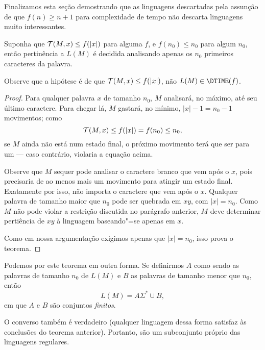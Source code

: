 Finalizamos esta seção demostrando que
as linguagens descartadas pela assunção de que
$f(n) \geq n+1$ para complexidade de tempo
não descarta linguagens muito interessantes.

\begin{proposition}
    Suponha que ${\mathcal{T}}(M, x) \leq f(|x|)$ para alguma $f$,
    e $f(n_0) \leq n_0$ para algum $n_0$,
    então pertinência a $L(M)$
    é decidida analisando apenas os $n_0$ primeiros caracteres da palavra.
    \label{regularidade_tempo_sublinear}
\end{proposition}

Observe que a hipótese é de que
${\mathcal{T}}(M, x) \leq f(|x|)$,
não
$L(M) \in \DTIME(f)$.

\begin{proof}
    Para qualquer palavra $x$ de tamanho $n_0$,
    $M$ analisará,
    no máximo,
    até seu último caractere.
    Para chegar lá, $M$ gastará,
    no mínimo,
    $|x| - 1 = n_0 - 1$ movimentos;
    como
    \begin{equation*}
        {\mathcal{T}}(M, x) \leq f(|x|) = f(n_0) \leq n_0,
    \end{equation*}
    se $M$ ainda não está num estado final,
    o próximo movimento terá que ser para um
    --- caso contrário,
    violaria a equação acima.

    Observe que $M$ sequer pode analisar o caractere branco
    que vem após o $x$,
    pois precisaria de ao menos mais um movimento
    para atingir um estado final.
    Exatamente por isso, não importa o caractere que vem após o $x$.
    Qualquer palavra de tamanho maior que $n_0$
    pode ser quebrada em $xy$, com $|x| = n_0$.
    Como $M$ não pode violar a restrição discutida no parágrafo anterior,
    $M$ deve determinar pertiência de $xy$ à linguagem
    baseando"=se apenas em $x$.

    Como em nossa argumentação
    exigimos apenas que $|x| = n_0$,
    isso prova o teorema.
\end{proof}

Podemos por este teorema em outra forma.
Se definirmos $A$ como sendo as palavras de tamanho $n_0$
de $L(M)$
e $B$ as palavras de tamanho menor que $n_0$,
então
\begin{equation*}
    L(M) = A\Sigma^* \cup B,
\end{equation*}
em que $A$ e $B$ são conjuntos \emph{finitos}.

O converso também é verdadeiro
(qualquer linguagem dessa forma
satisfaz às conclusões do teorema anterior).
Portanto, são um subconjunto próprio
das linguagens regulares.
